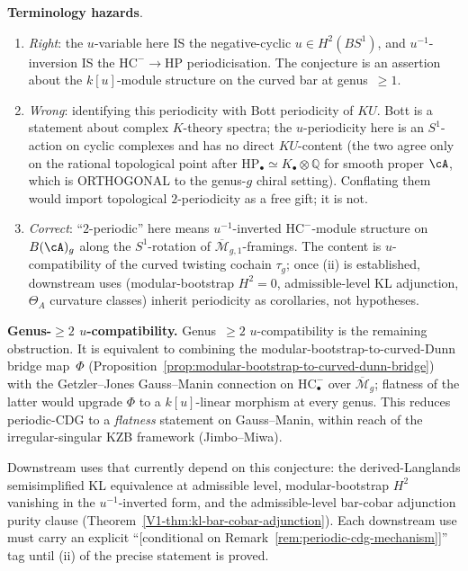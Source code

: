 \begin{remark}
\medskip
\noindent\textbf{Terminology hazards}.
\begin{enumerate}[label=\textup{(\alph*)}]
\item \emph{Right}: the $u$-variable here IS the
negative-cyclic $u \in H^2(BS^1)$, and $u^{-1}$-inversion IS
the $\mathrm{HC}^- \to \mathrm{HP}$ periodicisation. The
conjecture is an assertion about the $k[u]$-module structure
on the curved bar at genus~$\geq 1$.
\item \emph{Wrong}: identifying this periodicity with Bott
periodicity of $KU$. Bott is a statement about complex
$K$-theory spectra; the $u$-periodicity here is an
$S^1$-action on cyclic complexes and has no direct
$KU$-content (the two agree only on the rational topological
point after
$\mathrm{HP}_\bullet \simeq K_\bullet \otimes \mathbb{Q}$ for
smooth proper $\cA$, which is ORTHOGONAL to the genus-$g$
chiral setting). Conflating them would import topological
$2$-periodicity as a free gift; it is not.
\item \emph{Correct}: ``$2$-periodic'' here means
$u^{-1}$-inverted $\mathrm{HC}^-$-module structure on
$B(\cA)_g$ along the $S^1$-rotation of
$\overline{\mathcal{M}}_{g,1}$-framings. The content is
$u$-compatibility of the curved twisting cochain $\tau_g$;
once (ii) is established, downstream uses
(modular-bootstrap $H^2 = 0$, admissible-level KL adjunction,
$\Theta_A$ curvature classes) inherit periodicity as
corollaries, not hypotheses.
\end{enumerate}

\medskip
\noindent\textbf{Genus-\(\geq2\) \(u\)-compatibility.} Genus~$\geq 2$ $u$-compatibility is
the remaining obstruction. It is equivalent to combining the
modular-bootstrap-to-curved-Dunn bridge map~$\Phi$
(Proposition~\ref{prop:modular-bootstrap-to-curved-dunn-bridge})
with the Getzler--Jones Gauss--Manin connection on
$\mathrm{HC}^-_\bullet$ over $\overline{\mathcal{M}}_g$; flatness
of the latter would upgrade $\Phi$ to a $k[u]$-linear morphism at
every genus. This reduces periodic-CDG to a \emph{flatness}
statement on Gauss--Manin, within reach of the irregular-singular
KZB framework (Jimbo--Miwa).

\medskip
\noindent Downstream uses that currently depend on this
conjecture: the derived-Langlands semisimplified KL equivalence at
admissible level, modular-bootstrap $H^2$ vanishing in the
$u^{-1}$-inverted form, and the admissible-level bar-cobar
adjunction purity clause
(Theorem~\ref{V1-thm:kl-bar-cobar-adjunction}).
Each downstream use must carry an explicit
``\textup{[conditional on Remark~\ref{rem:periodic-cdg-mechanism}]}''
tag until (ii) of the precise statement is proved.
\end{remark}

